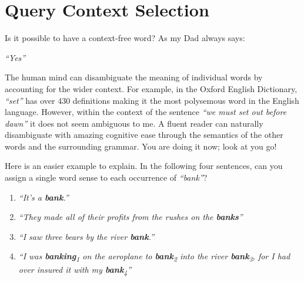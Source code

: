 \chapter{Query Context Selection}





Is it possible to have a context-free word? As my Dad always says:

\begin{center}
    \centering
    \textit{``Yes''}
\end{center}

The human mind can disambiguate the meaning of individual words by accounting for the wider context. For example, in the Oxford English Dictionary, \textit{``set''} has over 430 definitions making it the most polysemous word in the English language. However, within the context of the sentence \textit{``we must set out before dawn''} it does not seem ambiguous to me. A fluent reader can naturally disambiguate with amazing cognitive ease through the semantics of the other words and the surrounding grammar. You are doing it now; look at you go!

Here is an easier example to explain. In the following four sentences, can you assign a single word sense to each occurrence of \textit{``bank''}?

\begin{enumerate}
    \item \textit{``It's a \textbf{bank}.''}
    \item \textit{``They made all of their profits from the rushes on the \textbf{banks}''}
    \item \textit{``I saw three bears by the river \textbf{bank}.''}
    \item \textit{``I was \textbf{banking}\textsubscript{1} on the aeroplane to \textbf{bank}\textsubscript{2} into the river \textbf{bank}\textsubscript{3}, for I had over insured it with my \textbf{bank}\textsubscript{4}''}
\end{enumerate}


